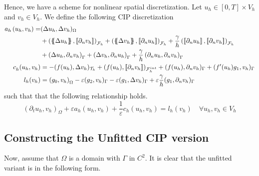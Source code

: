Hence, we have a scheme for nonlinear spatial discretization. Let $u_{h} \in \left[ 0,T \right] \times V_{h}  $ and $v_{h} \in V_{h}$. We define the following CIP discretization
\begin{equation}
    \label{eq:cip_ch}
    \begin{split}
        a_{h} \left( u_{h}, v_{h} \right)   =& ( \Delta  u_{h}, \Delta v_{h} ) _{ \Omega } \\
                                     & + \left( \mean{  \Delta  u_{h} }, \jump{ \partial _{n }v_{h}} \right)_{\mathcal{F}_{h}  }  + \left( \mean{ \Delta  v_{h} }, \jump{ \partial _{n}u_{h} }      \right)_{\mathcal{F}_{h}  }  + \frac{\gamma }{h}
                                     \left( \jump{ \partial _{n} u_{h}}, \jump{ \partial _{n} v_{h}   }   \right)_{\mathcal{F}_{h} } \\
                                     & + \left(   \Delta  u_{h} ,  \partial _{n }v_{h} \right)_{\Gamma   }  + \left(  \Delta  v_{h} ,  \partial _{n}u_{h}       \right)_{\Gamma  }  + \frac{\gamma }{h}  \left(  \partial _{n} u_{h},  \partial _{n} v_{h}      \right)_{ \Gamma } \\
    c^{}_{h} ( u_{h},v_{h})  & = -( f( u_{h}), \Delta v_{h} )_{\mathcal{T} _{h}}+  ( f( u_{h}) , \jump{ \partial _{n}v_{h} }  )_{\mathcal{F} _{h}^{int}} + ( f(u_{h}), \partial _{n} v_{h})_{\Gamma  }  + ( f'( u_{h})  g_{1}   ,  v_{h})_{\Gamma } \\
    l_{h}( v_{h}) & =  \left( g_{0}, v_{h} \right) _{\Omega } -  \varepsilon ( g_{2},  v_{h} )_{\Gamma }  -  \varepsilon ( g_{1}, \Delta  v_{h}  )_{\Gamma }  + \varepsilon \frac{\gamma }{h} ( g_{1}, \partial _{n} v_{h}  )_{\Gamma }
    \end{split}
\end{equation}
such that that the following relationship holds.
\[
    ( \partial _{t}u_{h}, v_{h})_\Omega + \varepsilon  a_{h}( u_{h},v_{h}) + \frac{1}{\varepsilon }c_{h}( u_{h},v_{h})   =  l_{h}(v_{h}) \quad  \forall u_{h}, v_{h} \in V_{h}
\]

\subsection{Constructing the Unfitted CIP version}%
\label{sub:constructing_the_unfitted_cip_version}

Now, assume that $\Omega $ is a domain with $\Gamma $ in $C^2$. It is clear that the unfitted variant is in the following form.




